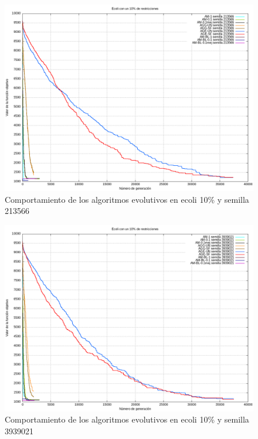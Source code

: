\documentclass[12pt, spanish]{article}
\begin{document}
\begin{figure}[H]
  \centering
      \includegraphics[scale = 0.50]{ecoli_set_const_10_213566.png}
 		 \caption{Comportamiento de los algoritmos evolutivos en ecoli 10\% y semilla 213566}
  		\label{fig:g-213566}

\end{figure}

\begin{figure}[H]
  \centering
      \includegraphics[scale = 0.50]{ecoli_set_const_10_3939021.png}
 		 \caption{Comportamiento de los algoritmos evolutivos en ecoli 10\% y semilla 3939021}
  		\label{fig:g-213566}

\end{figure}
\end{document}
